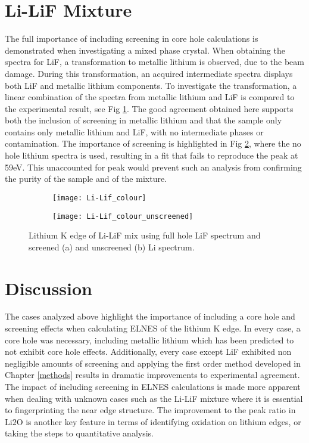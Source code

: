 \section{Li-LiF Mixture}
The full importance of including screening in core hole calculations is demonstrated when investigating a mixed phase crystal.  When obtaining the spectra for LiF, a transformation to metallic lithium is observed, due to the beam damage.   During this transformation, an acquired intermediate spectra displays both LiF and metallic lithium components.  To investigate the transformation, a linear combination of the spectra from metallic lithium and LiF is compared to the experimental result, see Fig \ref{mix-screened}.  The good agreement obtained here supports both the inclusion of screening in metallic lithium and that the sample only contains only metallic lithium and LiF, with no intermediate phases or contamination.  The importance of screening is highlighted in Fig \ref{mix-unscreened}, where the no hole lithium spectra is used, resulting in a  fit that fails to reproduce the peak at 59eV.  This unaccounted for peak would prevent such an  analysis from confirming the purity of the sample and of the mixture.  



\begin{figure}
	\centering
	\begin{subfigure}{0.45\textwidth}
		
		\texttt{[image: Li-Lif\_colour]}
		\caption{}
		\label{mix-screened}
	\end{subfigure}
\hspace{-0.01cm}
	\begin{subfigure}{0.45\textwidth}
		\texttt{[image: Li-Lif\_colour\_unscreened]}
		\caption{}
		\label{mix-unscreened}
	\end{subfigure}
	\caption{Lithium K edge of Li-LiF mix using full hole LiF spectrum and screened (a) and unscreened (b) Li spectrum. }

\label{Li-LiF_mix_screened}
\end{figure}



\section{Discussion}
The  cases analyzed above highlight the importance of including a core hole and screening effects when calculating ELNES of the lithium K edge.  In every case, a core hole was necessary, including metallic lithium which has been predicted to not exhibit core hole effects.  Additionally, every case except LiF exhibited non negligible amounts of screening  and applying the first order method developed in Chapter \ref{methods} results in dramatic improvements to experimental agreement.  The impact of including screening in ELNES calculations is made more apparent when dealing with unknown cases such as the Li-LiF mixture where it is essential to fingerprinting the near edge structure.  The improvement to the peak ratio in $ \mathrm{Li2O} $ is another key feature in terms of identifying oxidation on lithium edges, or taking the steps to quantitative analysis.  \\

